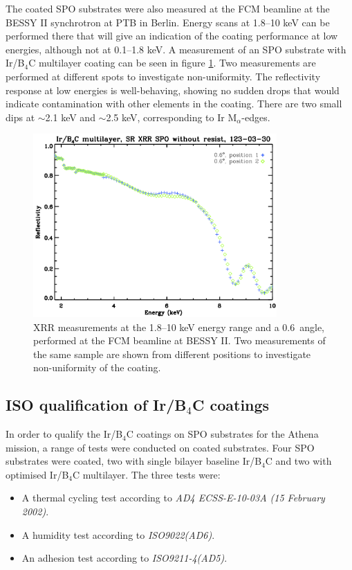 The coated SPO substrates were also measured at the FCM beamline at the BESSY II synchrotron at PTB in Berlin. Energy scans at 1.8--10 keV can be performed there that will give an indication of the coating performance at low energies, although not at 0.1--1.8 keV. A measurement of an SPO substrate with Ir/B$_4$C multilayer coating can be seen in figure \ref{fig:spo_bessy}. Two measurements are performed at different spots to investigate non-uniformity. The reflectivity response at low energies is well-behaving, showing no sudden drops that would indicate contamination with other elements in the coating. There are two small dips at $\sim$2.1 keV and $\sim$2.5 keV, corresponding to Ir M$_{\alpha}$-edges.

\begin{figure}[!h]
  \center
\includegraphics[height=7cm]{figures/athena/coating_on_spo/ml_irb4c_nores.jpg}
\caption{\footnotesize XRR measurements at the 1.8--10 keV energy range and a 0.6\degr\ angle, performed at the FCM beamline at BESSY II. Two measurements of the same sample are shown from different positions to investigate non-uniformity of the coating.}\label{fig:spo_bessy}
\end{figure}




\subsection{ISO qualification of Ir/B$_4$C coatings}\label{sec:qa_test}
In order to qualify the Ir/B$_4$C coatings on SPO substrates for the Athena mission, a range of tests were conducted on coated substrates. Four SPO substrates were coated, two with single bilayer baseline Ir/B$_4$C and two with optimised Ir/B$_4$C multilayer. The three tests were:

\begin{itemize}
 \item A thermal cycling test according to \emph{AD4 ECSS-E-10-03A (15 February 2002)}.
 \item A humidity test according to \emph{ISO9022(AD6)}.
 \item An adhesion test according to \emph{ISO9211-4(AD5)}.
\end{itemize}

